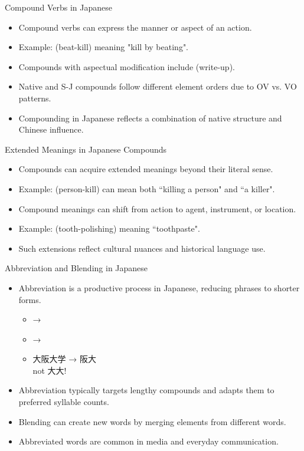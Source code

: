 \documentclass{beamer}
\begin{document}
\begin{frame}{Compound Verbs in Japanese}
    \begin{itemize}
        \item Compound verbs can express the manner or aspect of an action.
        \item Example:  (beat-kill) meaning "kill by beating".
        \item Compounds with aspectual modification include  (write-up).
        \item Native and S-J compounds follow different element orders due to OV vs. VO patterns.
        \item Compounding in Japanese reflects a combination of native structure and Chinese influence.
    \end{itemize}
\end{frame}

\begin{frame}{Extended Meanings in Japanese Compounds}
    \begin{itemize}
        \item Compounds can acquire extended meanings beyond their literal sense.
        \item Example:  (person-kill) can mean both ``killing a person" and ``a killer".
        \item Compound meanings can shift from action to agent, instrument, or location.
        \item Example:  (tooth-polishing) meaning ``toothpaste".
        \item Such extensions reflect cultural nuances and historical language use.
    \end{itemize}
\end{frame}

\begin{frame}{Abbreviation and Blending in Japanese}
    \begin{itemize}
    \item Abbreviation is a productive process in Japanese, reducing phrases to shorter forms.
      \begin{itemize}
      \item  {} → 
      \item {}  → 
      \item 大阪大学   → 阪大 
        \\  not 大大!
      \end{itemize}

        \item Abbreviation typically targets lengthy compounds and adapts them to preferred syllable counts.
        \item Blending can create new words by merging elements from different words.
        \item Abbreviated words are common in media and everyday communication.
    \end{itemize}
\end{frame}
\end{document}
